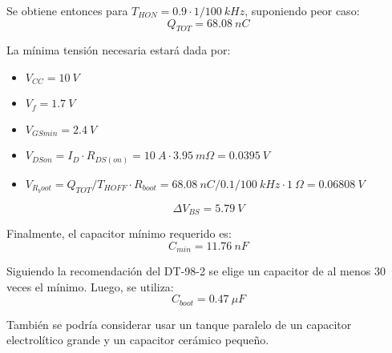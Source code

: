 \documentclass[titlepage, 12pt]{article}
\begin{document}
Se obtiene entonces para $T_{HON} = 0.9 \cdot 1/\SI{100}{kHz}$, suponiendo peor caso:
\[
    Q_{TOT} = \SI{68.08}{nC}
\]

La mínima tensión necesaria estará dada por:
\begin{itemize}
    \item $V_{CC} = \SI{10}{V}$
    \item $V_f = \SI{1.7}{V}$
    \item $V_{GSmin} = \SI{2.4}{V}$
    \item $V_{DSon} = I_D \cdot R_{DS(on)} = \SI{10}{A} \cdot \SI{3.95}{m\Omega} = \SI{0.0395}{V}$
    \item $V_{R_boot} = Q_{TOT} / T_{HOFF} \cdot R_{boot} = \SI{68.08}{nC} / 0.1/\SI{100}{kHz} \cdot \SI{1}{\Omega} = \SI{0.06808}{V}$
\end{itemize}
\[
    \Delta V_{BS} = \SI{5.79}{V}
\]

Finalmente, el capacitor mínimo requerido es:
\[
    C_{min} = \SI{11.76}{nF}
\]

Siguiendo la recomendación del DT-98-2 se elige un capacitor de al menos 30 veces el mínimo. Luego, se utiliza:
\[
    C_{boot} = \SI{0.47}{\mu F}
\]

También se podría considerar usar un tanque paralelo de un capacitor electrolítico grande y un capacitor cerámico pequeño.
\end{document}
